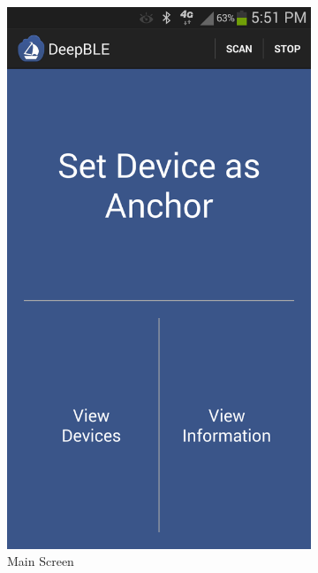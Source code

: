 \documentclass{sig-alternate}
\begin{document}
\begin{figure}[h!]
	\centering
	\begin{subfigure}{.5\linewidth}
		\centering
		\includegraphics[width=.8\linewidth]{main_activity}
		\caption{Main Screen}
	\end{subfigure}%
	\begin{subfigure}{.5\linewidth}
		\centering

\end{subfigure}
\end{figure}
\end{document}
